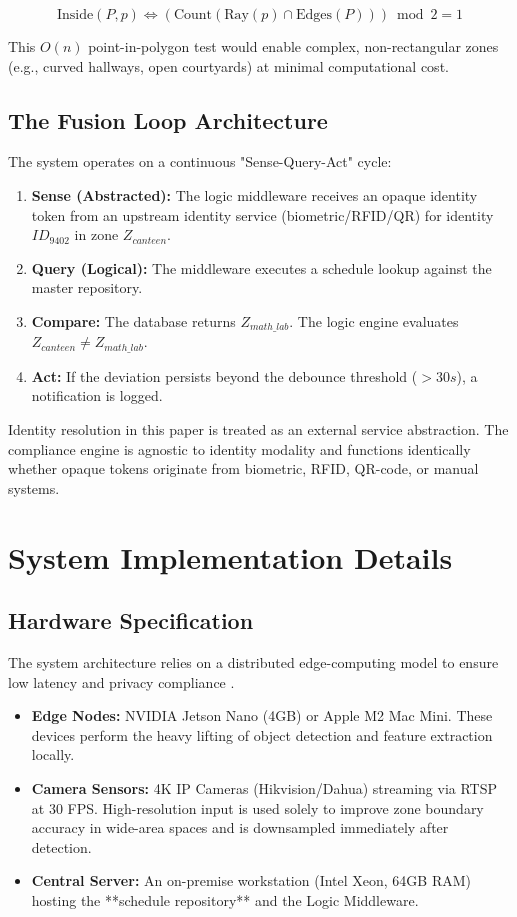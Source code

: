 \documentclass[conference]{IEEEtran}
\begin{document}
\begin{equation}
\text{Inside}(P, p) \iff (\text{Count}(\text{Ray}(p) \cap \text{Edges}(P))) \bmod 2 = 1
\end{equation}

This $O(n)$ point-in-polygon test would enable complex, non-rectangular zones (e.g., curved hallways, open courtyards) at minimal computational cost.

\subsection{The Fusion Loop Architecture}
The system operates on a continuous "Sense-Query-Act" cycle:
\begin{enumerate}
    \item \textbf{Sense (Abstracted):} The logic middleware receives an opaque identity token from an upstream identity service (biometric/RFID/QR) for identity $ID_{9402}$ in zone $Z_{canteen}$.
    \item \textbf{Query (Logical):} The middleware executes a schedule lookup against the master repository.
    \item \textbf{Compare:} The database returns $Z_{math\_lab}$. The logic engine evaluates $Z_{canteen} \neq Z_{math\_lab}$.
    \item \textbf{Act:} If the deviation persists beyond the debounce threshold ($>30s$), a notification is logged.
\end{enumerate}

Identity resolution in this paper is treated as an external service abstraction. The compliance engine is agnostic to identity modality and functions identically whether opaque tokens originate from biometric, RFID, QR-code, or manual systems.

\section{System Implementation Details}

\subsection{Hardware Specification}
The system architecture relies on a distributed edge-computing model to ensure low latency and privacy compliance \cite{b15}.
\begin{itemize}
    \item \textbf{Edge Nodes:} NVIDIA Jetson Nano (4GB) or Apple M2 Mac Mini. These devices perform the heavy lifting of object detection and feature extraction locally.
    \item \textbf{Camera Sensors:} 4K IP Cameras (Hikvision/Dahua) streaming via RTSP at 30 FPS. High-resolution input is used solely to improve zone boundary accuracy in wide-area spaces and is downsampled immediately after detection.
    \item \textbf{Central Server:} An on-premise workstation (Intel Xeon, 64GB RAM) hosting the **schedule repository** and the Logic Middleware.
\end{itemize}
\end{document}
